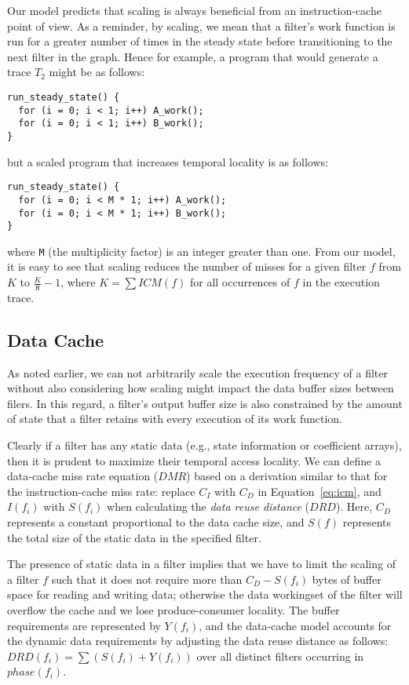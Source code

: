 Our model predicts that scaling is always beneficial from an
instruction-cache point of view. As a reminder, by scaling, we mean
that a filter's work function is run for a greater number of times in
the steady state before transitioning to the next filter in the
graph. Hence for example, a program that would generate a trace $T_2$
might be as follows:
{\small
\begin{verbatim}
run_steady_state() {
  for (i = 0; i < 1; i++) A_work();
  for (i = 0; i < 1; i++) B_work();
}
\end{verbatim}}
but a scaled program that increases temporal locality is as follows:
{\small
\begin{verbatim}
run_steady_state() {
  for (i = 0; i < M * 1; i++) A_work();
  for (i = 0; i < M * 1; i++) B_work();
}
\end{verbatim}}
where \texttt{M} (the multiplicity factor) is an integer greater than
one. From our model, it is easy to see that scaling reduces the number
of misses for a given filter $f$ from $K$ to $\frac{K}{\texttt{M}}- 1$, where $K =
\sum ICM(f)$ for all occurrences of $f$ in  the execution trace.

\subsection{Data Cache}

As noted earlier, we can not arbitrarily scale the execution frequency
of a filter without also considering how scaling might impact
the data buffer sizes between filers. In this regard, a filter's
output buffer size is also constrained by the amount of state that a
filter retains with every execution of its work function.

Clearly if a filter has any static data (e.g., state information or
coefficient arrays), then it is prudent to maximize their temporal
access locality. We can define a data-cache miss rate equation ($DMR$) based on
a derivation similar to that for the instruction-cache miss rate:
replace $C_I$ with $C_D$ in Equation~\ref{eq:icm}, and $I(f_i)$ with
$S(f_i)$ when calculating the {\it data reuse distance} ($DRD$). 
Here, $C_D$ represents a constant proportional to the data cache size,
and $S(f)$ represents the total size of the static data in the
specified filter.

The presence of static data in a filter implies that we have to limit
the scaling of a filter $f$ such that it does not require more than $C_D -
S(f_i)$ bytes of buffer space for reading and writing data; otherwise
the data workingset of the filter will overflow the cache and we lose
produce-consumer locality. The buffer requirements are represented by
$Y(f_i)$, and the data-cache model accounts for the dynamic data
requirements by adjusting the data reuse distance as follows:
$DRD(f_i) = \sum (S(f_i) + Y(f_i))$ over all distinct filters occurring
in $phase(f_i)$.

